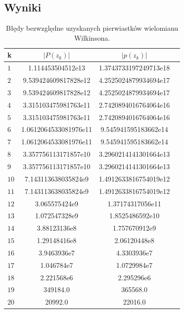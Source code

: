 \documentclass{classrep}
\begin{document}
	\subsection{Wyniki}
		\begin{table}[!h]
        	\centering
        	\footnotesize
			\begin{tabular}{l|S|S|S} \toprule
				{k} & {$|P(z_k)|$} & {$|p(z_k)|$}\\ \midrule
				$1$ & 1.114453504512e13 & 1.3743733197249713e18 \\ 
	 			$2$ & 9.539424609817828e12 & 4.2525024879934694e17 \\
	 			$3$ & 9.539424609817828e12 & 4.2525024879934694e17 \\
	 			$4$ & 3.315103475981763e11 & 2.7420894016764064e16 \\
	 			$5$ & 3.315103475981763e11 & 2.7420894016764064e16 \\ 
	 			$6$ & 1.0612064533081976e11 & 9.545941595183662e14 \\
	 			$7$ & 1.0612064533081976e11 & 9.545941595183662e14 \\
	 			$8$ & 3.357756113171857e10 & 3.2960214141301664e13 \\ 
	 			$9$ & 3.357756113171857e10 & 3.2960214141301664e13 \\
	 			$10$ & 7.143113638035824e9 & 1.4912633816754019e12 \\
	 			$11$ & 7.143113638035824e9 & 1.4912633816754019e12 \\ 
	 			$12$ & 3.065575424e9 & 1.37174317056e11 \\
	 			$13$ & 1.072547328e9 & 1.8525486592e10 \\ 
	 			$14$ & 3.88123136e8 & 1.757670912e9 \\
	 			$15$ & 1.29148416e8 & 2.06120448e8 \\
	 			$16$ & 3.9463936e7 & 4.3303936e7 \\ 
	 			$17$ & 1.046784e7 & 1.0729984e7 \\
	 			$18$ & 2.221568e6 & 2.295296e6 \\ 
	 			$19$ & 349184.0 & 365568.0 \\
	 			$20$ & 20992.0 & 22016.0 \\ \bottomrule
	 		\end{tabular}
	 		\caption{Błędy bezwzględne uzyskanych pierwiastków wielomianu Wilkinsona.}
			\label{table:2}
		\end{table}	
		
\end{document}
